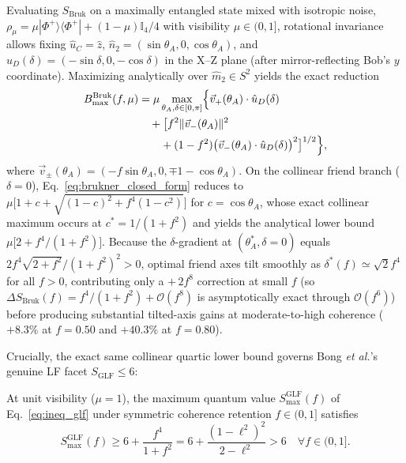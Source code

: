 Evaluating $S_{\mathrm{Bruk}}$ on a maximally entangled state mixed with isotropic noise, $\rho_\mu = \mu |\Phi^+\rangle\langle\Phi^+| + (1 - \mu)\mathbb{I}_4/4$ with visibility $\mu \in (0, 1]$, rotational invariance allows fixing $\hat{u}_C = \hat{z}$, $\hat{n}_2 = (\sin\theta_A, 0, \cos\theta_A)$, and $\hat{u}_D(\delta) = (-\sin\delta, 0, -\cos\delta)$ in the X--Z plane (after mirror-reflecting Bob's $y$ coordinate). Maximizing analytically over $\hat{m}_2 \in S^2$ yields the exact reduction
\begin{equation}\label{eq:brukner_closed_form}
\begin{aligned}
B_{\max}^{\mathrm{Bruk}}(f, \mu) &= \mu \max_{\theta_A, \delta \in [0, \pi]} \Bigl\{
    \vec{v}_+(\theta_A) \cdot \hat{u}_D(\delta) \\
    &\quad + \bigl[ f^2 \|\vec{v}_-(\theta_A)\|^2 \\
    &\qquad + (1 - f^2)\bigl(\vec{v}_-(\theta_A) \cdot \hat{u}_D(\delta)\bigr)^2 \bigr]^{1/2} \Bigr\},
\end{aligned}
\end{equation}
where $\vec{v}_\pm(\theta_A) = (-f\sin\theta_A, 0, \mp 1 - \cos\theta_A)$. On the collinear friend branch ($\delta = 0$), Eq.~\eqref{eq:brukner_closed_form} reduces to $\mu\bigl[1 + c + \sqrt{(1-c)^2 + f^4(1-c^2)}\bigr]$ for $c = \cos\theta_A$, whose exact collinear maximum occurs at $c^* = 1/(1+f^2)$ and yields the analytical lower bound $\mu\bigl[2 + f^4/(1+f^2)\bigr]$. Because the $\delta$-gradient at $(\theta_A^*, \delta=0)$ equals $2f^4\sqrt{2+f^2}/(1+f^2)^2 > 0$, optimal friend axes tilt smoothly as $\delta^*(f) \simeq \sqrt{2}f^4$ for all $f > 0$, contributing only a $+\,2f^8$ correction at small $f$ (so $\Delta S_{\mathrm{Bruk}}(f) = f^4/(1+f^2) + \mathcal{O}(f^8)$ is asymptotically exact through $\mathcal{O}(f^6)$) before producing substantial tilted-axis gains at moderate-to-high coherence ($+8.3\%$ at $f=0.50$ and $+40.3\%$ at $f=0.80$).

Crucially, the exact same collinear quartic lower bound governs Bong \emph{et al.}'s genuine LF facet $S_{\mathrm{GLF}} \le 6$:

\begin{proposition}
At unit visibility ($\mu = 1$), the maximum quantum value $S_{\max}^{\mathrm{GLF}}(f)$ of Eq.~\eqref{eq:ineq_glf} under symmetric coherence retention $f \in (0, 1]$ satisfies
\begin{equation}
    S_{\max}^{\mathrm{GLF}}(f) \ge 6 + \frac{f^4}{1 + f^2} = 6 + \frac{(1 - \ell^2)^2}{2 - \ell^2} > 6 \quad \forall f \in (0, 1].
    \label{eq:glf_quartic}
\end{equation}
\end{proposition}


